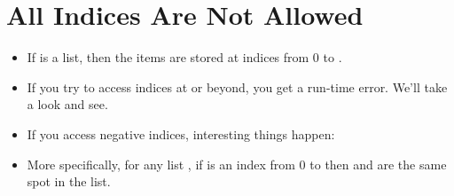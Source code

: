 \documentclass[letterpaper,10pt,english]{sphinxmanual}
\begin{document}
\section{All Indices Are Not Allowed}
\label{\detokenize{lecture_notes/lec08_lists1:all-indices-are-not-allowed}}\begin{itemize}
\item {} 
If  is a list, then the items are stored at indices from 0 to
.

\item {} 
If you try to access indices at  or beyond, you get a
run-time error. We’ll take a look and see.

\item {} 
If you access negative indices, interesting things happen:

%
\begin{sphinxVerbatim}[commandchars=\\\{\}]
\PYG{p}{[}\PYG{p}{]}
\end{sphinxVerbatim}

\item {} 
More specifically, for any list , if  is an index from 0 to
 then  and  are the same spot in
the list.

\end{itemize}
\end{document}

